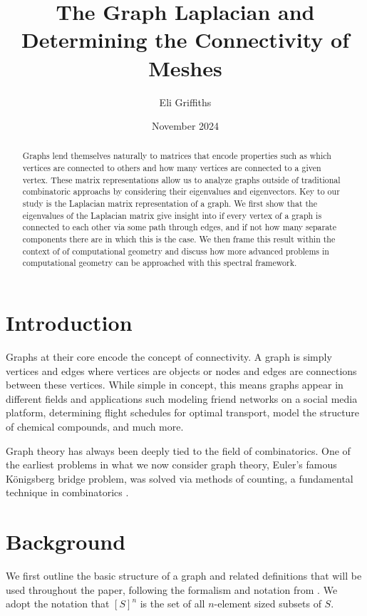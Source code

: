 \documentclass[12pt]{article}
\title{The Graph Laplacian and Determining the Connectivity of Meshes}
\author{Eli Griffiths}
\date{November 2024}
\begin{document}
\maketitle

\begin{abstract}
    Graphs lend themselves naturally to matrices that encode properties such as which vertices are connected to others and how many vertices are connected to a given vertex. These matrix representations allow us to analyze graphs outside of traditional combinatoric approachs by considering their eigenvalues and eigenvectors. Key to our study is the Laplacian matrix representation of a graph. We first show that the eigenvalues of the Laplacian matrix give insight into if every vertex of a graph is connected to each other via some path through edges, and if not how many separate components there are in which this is the case. We then frame this result within the context of of computational geometry and discuss how more advanced problems in computational geometry can be approached with this spectral framework.
\end{abstract}

\section{Introduction}

Graphs at their core encode the concept of connectivity. A graph is simply vertices and edges where vertices are objects or nodes and edges are connections between these vertices. While simple in concept, this means graphs appear in different fields and applications such modeling friend networks on a social media platform, determining flight schedules for optimal transport, model the structure of chemical compounds, and much more.

Graph theory has always been deeply tied to the field of combinatorics. One of the earliest problems in what we now consider graph theory, Euler's famous K\"onigsberg bridge problem, was solved via methods of counting, a fundamental technique in combinatorics \cite{wilson2013combinatorics}.



\section{Background}

We first outline the basic structure of a graph and related definitions that will be used throughout the paper, following the formalism and notation from \cite{diestelGraphTheory2017}. We adopt the notation that $[S]^n$ is the set of all $n$-element sized subsets of $S$.
\end{document}
